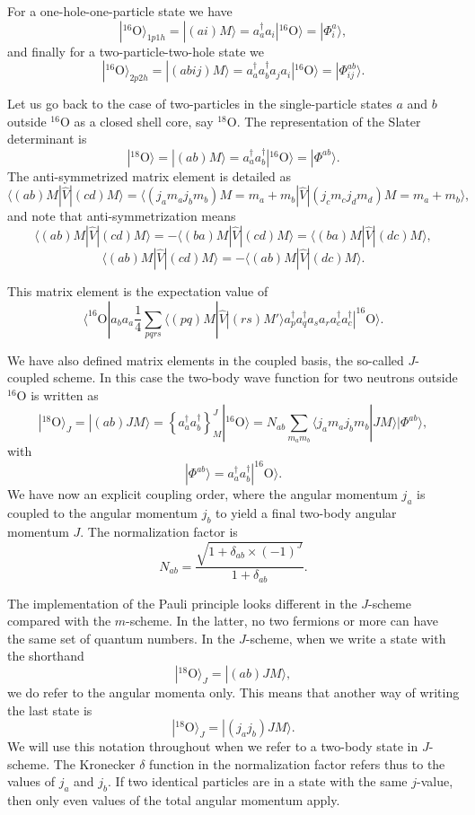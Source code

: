 \documentclass[graybox,sectrefs,envcountresetchap,open=right]{svmonodo}
\begin{document}
For a one-hole-one-particle state we have
\[
|^{16}\mathrm{O}\rangle_{1p1h} =|(ai)M\rangle  = a_a^{\dagger}a_i|^{16}\mathrm{O}\rangle=|\Phi_{i}^a\rangle,
\]
and finally for a two-particle-two-hole state we 
\[
|^{16}\mathrm{O}\rangle_{2p2h} =|(abij)M\rangle  = a_a^{\dagger}a_b^{\dagger}a_ja_i|^{16}\mathrm{O}\rangle=|\Phi_{ij}^{ab}\rangle.
\]



Let us go back to the case of two-particles in the single-particle states $a$ and $b$ outside ${}^{16}\mbox{O}$ as a closed shell core, say ${}^{18}\mbox{O}$.
The representation of the Slater determinant is 
\[
|^{18}\mathrm{O}\rangle =|(ab)M\rangle  = a^{\dagger}_aa^{\dagger}_b|^{16}\mathrm{O}\rangle=|\Phi^{ab}\rangle.
\]
The anti-symmetrized matrix element is detailed as 
\[
\langle (ab) M | \hat{V} | (cd) M \rangle = \langle (j_am_aj_bm_b)M=m_a+m_b |  \hat{V} | (j_cm_cj_dm_d)M=m_a+m_b \rangle,
\]
and note that anti-symmetrization means 
\[
\langle (ab) M | \hat{V} | (cd) M \rangle =-\langle (ba) M | \hat{V} | (cd) M \rangle =\langle (ba) M | \hat{V} | (dc) M \rangle,
\]
\[
\langle (ab) M | \hat{V} | (cd) M \rangle =-\langle (ab) M | \hat{V} | (dc) M \rangle. 
\]



This matrix element is the expectation value of 
\[
\langle ^{16}\mathrm{O}|a_ba_a\frac{1}{4}\sum_{pqrs}\langle (pq) M | \hat{V} | (rs) M' \rangle a^{\dagger}_pa^{\dagger}_qa_sa_r a^{\dagger}_ca^{\dagger}_c|^{16}\mathrm{O}\rangle.
\]



We have also defined matrix elements in the coupled basis, the so-called $J$-coupled scheme.
In this case the two-body wave function for two neutrons outside ${}^{16}\mbox{O}$ is written as 
\[
|^{18}\mathrm{O}\rangle_J =|(ab)JM\rangle  = \left\{a^{\dagger}_aa^{\dagger}_b\right\}^J_M|^{16}\mathrm{O}\rangle=N_{ab}\sum_{m_am_b}\langle j_am_aj_bm_b|JM\rangle|\Phi^{ab}\rangle, 
\]
with 
\[
|\Phi^{ab}\rangle=a^{\dagger}_aa^{\dagger}_b|^{16}\mathrm{O}\rangle.
\]
We have now an explicit coupling order, where the angular momentum $j_a$ is coupled to the angular momentum $j_b$ to yield a final two-body angular momentum $J$. 
The normalization factor is
\[
N_{ab}=\frac{\sqrt{1+\delta_{ab}\times (-1)^J}}{1+\delta_{ab}}.
\]



The implementation of the Pauli principle looks different in the $J$-scheme compared with the $m$-scheme. In the latter, no two fermions or more can have the same set of quantum numbers. In the $J$-scheme, when we write a state with the shorthand 
\[
|^{18}\mathrm{O}\rangle_J =|(ab)JM\rangle,
\]
we do refer to the angular momenta only. This means that another way of writing the last state is
\[
|^{18}\mathrm{O}\rangle_J =|(j_aj_b)JM\rangle.
\]
We will use this notation throughout when we refer to a two-body state in $J$-scheme. The Kronecker $\delta$ function in the normalization factor 
refers thus to the values of $j_a$ and $j_b$. If two identical particles are in a state with the same $j$-value, then only even values of the total angular momentum apply.
\end{document}
